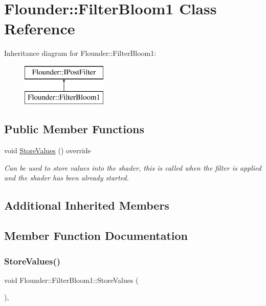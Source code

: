 \hypertarget{class_flounder_1_1_filter_bloom1}{}\section{Flounder\+:\+:Filter\+Bloom1 Class Reference}
\label{class_flounder_1_1_filter_bloom1}
Inheritance diagram for Flounder\+:\+:Filter\+Bloom1\+:\begin{figure}[H]
\begin{center}
\leavevmode
\includegraphics[height=2.000000cm]{class_flounder_1_1_filter_bloom1}
\end{center}
\end{figure}
\subsection*{Public Member Functions}
\begin{DoxyCompactItemize}
\item 
void \hyperlink{class_flounder_1_1_filter_bloom1_a4fcb30bf2d44114a4c555705d6325bee}{Store\+Values} () override
\begin{DoxyCompactList}\small\item\em Can be used to store values into the shader, this is called when the filter is applied and the shader has been already started. \end{DoxyCompactList}\end{DoxyCompactItemize}
\subsection*{Additional Inherited Members}


\subsection{Member Function Documentation}
\mbox{\label{class_flounder_1_1_filter_bloom1_a4fcb30bf2d44114a4c555705d6325bee}} 
\subsubsection{\texorpdfstring{Store\+Values()}{StoreValues()}}
{\footnotesize\ttfamily void Flounder\+::\+Filter\+Bloom1\+::\+Store\+Values (\begin{DoxyParamCaption}{ }\end{DoxyParamCaption})\hspace{0.3cm}{\ttfamily [override]}, {\ttfamily [virtual]}}



